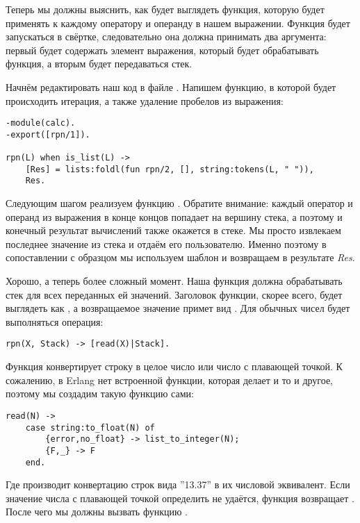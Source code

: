Теперь мы должны выяснить, как будет выглядеть функция, которую  будет применять к каждому оператору и операнду в нашем выражении.
Функция будет запускаться в свёртке, следовательно она должна принимать два аргумента: первый будет содержать элемент выражения, который будет обрабатывать функция, а вторым будет передаваться стек.

Начнём редактировать наш код в файле .
Напишем функцию, в которой будет происходить итерация, а также удаление пробелов из выражения:
\begin{lstlisting}[style=erlang]
-module(calc).
-export([rpn/1]).
 
rpn(L) when is_list(L) ->
    [Res] = lists:foldl(fun rpn/2, [], string:tokens(L, " ")),
    Res.
\end{lstlisting}

Следующим шагом реализуем функцию .
Обратите внимание: каждый оператор и операнд из выражения в конце концов попадает на вершину стека, а поэтому и конечный результат вычислений также окажется в стеке.
Мы просто извлекаем последнее значение из стека и отдаём его пользователю.
Именно поэтому в сопоставлении с образцом мы используем шаблон \ops{[Res]} и возвращаем в результате \emph{Res}.

Хорошо, а теперь более сложный момент.
Наша функция  должна обрабатывать стек для всех переданных ей значений.
Заголовок функции, скорее всего, будет выглядеть как , а возвращаемое значение примет вид .
Для обычных чисел будет выполняться операция:
\begin{lstlisting}[style=erlang]
rpn(X, Stack) -> [read(X)|Stack].
\end{lstlisting}

Функция  конвертирует строку в целое число или число с плавающей точкой.
К сожалению, в Erlang нет встроенной функции, которая делает и то и другое, поэтому мы создадим такую функцию сами:
\begin{lstlisting}[style=erlang]
read(N) ->
    case string:to_float(N) of
        {error,no_float} -> list_to_integer(N);
        {F,_} -> F
    end.
\end{lstlisting}

Где  производит конвертацию строк вида ''13.37'' в их числовой эквивалент.
Если значение числа с плавающей точкой определить не удаётся, функция возвращает .
После чего мы должны вызвать функцию .


